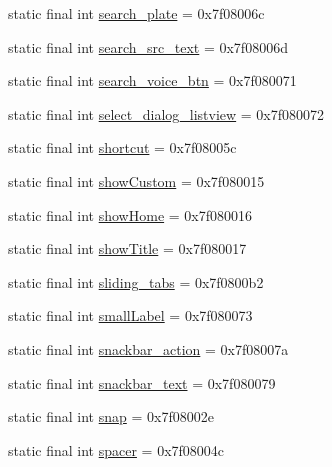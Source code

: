 \begin{CompactItemize}
\item 
static final int \hyperlink{classandroid_1_1support_1_1mediacompat_1_1_r_1_1id_9fba303f1c9cc8c85016e07a809db7cc}{search\_\-plate} = 0x7f08006c
\item 
static final int \hyperlink{classandroid_1_1support_1_1mediacompat_1_1_r_1_1id_540194c7c07b0d76ff29913b2b1cd8ce}{search\_\-src\_\-text} = 0x7f08006d
\item 
static final int \hyperlink{classandroid_1_1support_1_1mediacompat_1_1_r_1_1id_29303915bfffaf069b919815db792309}{search\_\-voice\_\-btn} = 0x7f080071
\item 
static final int \hyperlink{classandroid_1_1support_1_1mediacompat_1_1_r_1_1id_40ae64ca02935cffa8fd9fe43386f0d8}{select\_\-dialog\_\-listview} = 0x7f080072
\item 
static final int \hyperlink{classandroid_1_1support_1_1mediacompat_1_1_r_1_1id_04fdecb2661b288fee6899e9133d7ffc}{shortcut} = 0x7f08005c
\item 
static final int \hyperlink{classandroid_1_1support_1_1mediacompat_1_1_r_1_1id_0557e13076a8c2e1f7a674b512c95655}{showCustom} = 0x7f080015
\item 
static final int \hyperlink{classandroid_1_1support_1_1mediacompat_1_1_r_1_1id_defcddd0cad4a9de1bc8a44342b3b75b}{showHome} = 0x7f080016
\item 
static final int \hyperlink{classandroid_1_1support_1_1mediacompat_1_1_r_1_1id_28b999e96c65db8ff4adc354a31918a7}{showTitle} = 0x7f080017
\item 
static final int \hyperlink{classandroid_1_1support_1_1mediacompat_1_1_r_1_1id_bca76c126f4805450987148646e5e31e}{sliding\_\-tabs} = 0x7f0800b2
\item 
static final int \hyperlink{classandroid_1_1support_1_1mediacompat_1_1_r_1_1id_1d519350824b982c87575ee04c9b0e99}{smallLabel} = 0x7f080073
\item 
static final int \hyperlink{classandroid_1_1support_1_1mediacompat_1_1_r_1_1id_190d4a0812a8a33ea8ca28d709dd61a8}{snackbar\_\-action} = 0x7f08007a
\item 
static final int \hyperlink{classandroid_1_1support_1_1mediacompat_1_1_r_1_1id_9259c50601b96a8a5322a69372f91acd}{snackbar\_\-text} = 0x7f080079
\item 
static final int \hyperlink{classandroid_1_1support_1_1mediacompat_1_1_r_1_1id_c8f285be8eb7874ac039ac9e59cfc53f}{snap} = 0x7f08002e
\item 
static final int \hyperlink{classandroid_1_1support_1_1mediacompat_1_1_r_1_1id_13c1d30928caaa393873833706a5ead3}{spacer} = 0x7f08004c

\end{CompactItemize}
